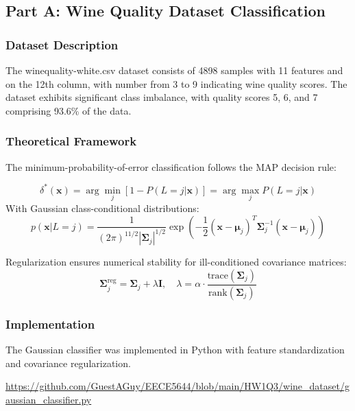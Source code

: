 \documentclass[12pt]{article}
\begin{document}
\subsection{Part A: Wine Quality Dataset Classification}

\subsubsection{Dataset Description}
The winequality-white.csv dataset consists of 4898 samples with 11  features and on the 12th column, with number from 3 to 9 indicating wine quality scores. The dataset exhibits significant class imbalance, with quality scores 5, 6, and 7 comprising 93.6\% of the data.

\subsubsection{Theoretical Framework}
The minimum-probability-of-error classification follows the MAP decision rule:

\begin{equation}
\delta^*(\mathbf{x}) = \arg\min_{j} \left[1 - P(L=j|\mathbf{x})\right] = \arg\max_{j} P(L=j|\mathbf{x})
\end{equation}
With Gaussian class-conditional distributions:
\begin{equation}
p(\mathbf{x}|L=j) = \frac{1}{(2\pi)^{11/2}|\boldsymbol{\Sigma}_j|^{1/2}} \exp\left(-\frac{1}{2}(\mathbf{x}-\boldsymbol{\mu}_j)^T\boldsymbol{\Sigma}_j^{-1}(\mathbf{x}-\boldsymbol{\mu}_j)\right)
\end{equation}

Regularization ensures numerical stability for ill-conditioned covariance matrices:
\begin{equation}
\boldsymbol{\Sigma}_j^{\text{reg}} = \boldsymbol{\Sigma}_j + \lambda\mathbf{I}, \quad \lambda = \alpha \cdot \frac{\text{trace}(\boldsymbol{\Sigma}_j)}{\text{rank}(\boldsymbol{\Sigma}_j)}
\end{equation}

\subsubsection{Implementation}
The Gaussian classifier was implemented in Python with feature standardization and covariance regularization.

\href{https://github.com/GuestAGuy/EECE5644/blob/main/HW1Q3/wine_dataset/gaussian_classifier.py}{https://github.com/GuestAGuy/EECE5644/blob/main/HW1Q3/wine_dataset/gaussian_classifier.py}
\end{document}
